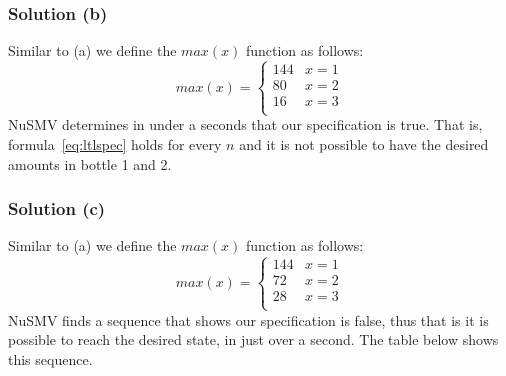 \documentclass[12pt]{article}
\begin{document}
\subsubsection*{Solution (b)}
Similar to (a) we define the $max(x)$ function as follows:
\begin{equation*}
max(x) = 
    \begin{cases}
        144 & x = 1\\  
        80  & x = 2\\  
        16  & x = 3\\  
    \end{cases}
\end{equation*}
NuSMV determines in under a seconds that our specification is true. That is, 
formula~\ref{eq:ltlspec} holds for every $n$ and it is not possible to have the 
desired amounts in bottle 1 and 2.

\subsubsection*{Solution (c)}
Similar to (a) we define the $max(x)$ function as follows:
\begin{equation*}
max(x) = 
    \begin{cases}
        144 & x = 1\\  
        72  & x = 2\\  
        28  & x = 3\\  
    \end{cases}
\end{equation*}
NuSMV finds a sequence that shows our specification is false, thus that is it is
possible to reach the desired state, in just over a second. The table below 
shows this sequence.
\end{document}
